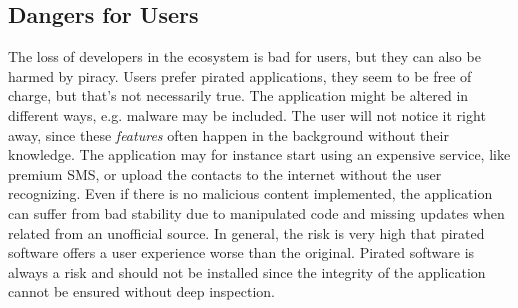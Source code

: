 \subsection{Dangers for Users} \label{subsection:foundation-piracy-users}
The loss of developers in the ecosystem is bad for users, but they can also be harmed by piracy.
Users prefer pirated applications, they seem to be free of charge, but that's not necessarily true.
The application might be altered in different ways, e.g. malware may be included.
The user will not notice it right away, since these \textit{features} often happen in the background without their knowledge.
The application may for instance start using an expensive service, like premium SMS, or upload the contacts to the internet without the user recognizing.
Even if there is no malicious content implemented, the application can suffer from bad stability due to manipulated code and missing updates when related from an unofficial source.
In general, the risk is very high that pirated software offers a user experience worse than the original. \cite{bitdefenderPlagiarism} \cite{lierschDeveloperThreats}
\newline
Pirated software is always a risk and should not be installed since the integrity of the application cannot be ensured without deep inspection.
